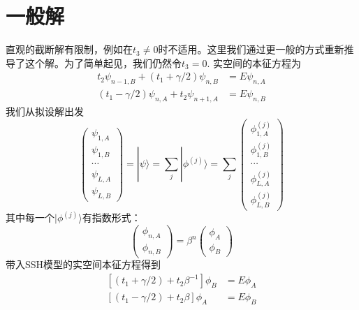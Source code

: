 \documentclass{article}
\begin{document}
\section{一般解}
直观的截断解有限制，例如在$t_3\neq 0$时不适用。这里我们通过更一般的方式重新推导了这个解。为了简单起见，我们仍然令$t_3=0$. 实空间的本征方程为
\begin{equation}
    \begin{split}
        t_2\psi_{n-1,B}+(t_1+\gamma/2)\psi_{n,B}&=E\psi_{n,A}\\
        (t_1-\gamma/2)\psi_{n,A}+t_2\psi_{n+1,A}&=E\psi_{n,B}
    \end{split}
\end{equation}
我们从拟设解出发
\begin{equation}
    \begin{pmatrix}
        \psi_{1,A}\\
        \psi_{1,B}\\
        \cdots\\
        \psi_{L,A}\\
        \psi_{L,B}
    \end{pmatrix}=|\psi\rangle=\sum_{j}|\phi^{(j)}\rangle=\sum_{j}\begin{pmatrix}
        \phi_{1,A}^{(j)}\\
        \phi_{1,B}^{(j)}\\
        \cdots\\
        \phi_{L,A}^{(j)}\\
        \phi_{L,B}^{(j)}
    \end{pmatrix}
\end{equation}
其中每一个$|\phi^{(j)}\rangle$有指数形式：
\begin{equation}
    \begin{pmatrix}
        \phi_{n,A}\\
        \phi_{n,B}
    \end{pmatrix}=\beta^n\begin{pmatrix}
        \phi_A\\
        \phi_B
    \end{pmatrix}
\end{equation}
带入SSH模型的实空间本征方程得到
\begin{equation}
    \begin{split}
        \left[(t_1+\gamma/2)+t_2\beta^{-1}\right]\phi_B&=E\phi_A\\
        \left[(t_1-\gamma/2)+t_2\beta\right]\phi_A&=E\phi_B
    \end{split}
\end{equation}
\end{document}
